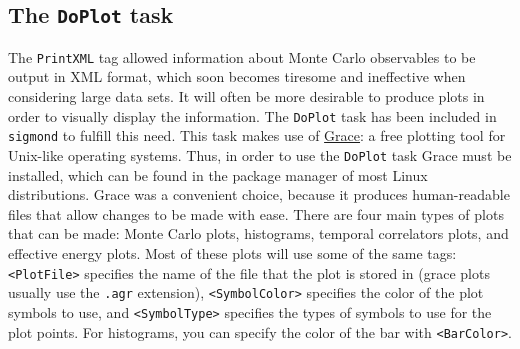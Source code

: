 \documentclass[12pt]{article}
\newcommand{\vb}{\texttt}
\begin{document}
\subsection{The \vb{DoPlot} task}

The \vb{PrintXML} tag allowed information about Monte Carlo observables to be output
in XML format, which soon becomes tiresome and ineffective when considering large data sets.
It will often be more desirable to produce plots in order to visually display the information.
The \vb{DoPlot} task has been included in \vb{sigmond} to fulfill this need. This task makes
use of \href{http://plasma-gate.weizmann.ac.il/Grace/}{Grace}: a free plotting tool
for Unix-like operating systems. Thus, in order to use the \vb{DoPlot} task Grace must
be installed, which can be found in the package manager of most Linux distributions.
Grace was a convenient choice, because it produces human-readable files that allow
changes to be made with ease.
There are four main types of plots that can be made: Monte Carlo plots,
histograms, temporal correlators plots, and effective energy plots.
Most of these plots will use some of the same tags: \vb{<PlotFile>}
specifies the name of the file that the plot is stored in (grace plots
usually use the \vb{.agr} extension), \vb{<SymbolColor>}
specifies the color of the plot symbols to use, and \vb{<SymbolType>}
specifies the types of symbols to use for the plot points.
For histograms, you can specify the color of the bar
with \vb{<BarColor>}.
\end{document}
